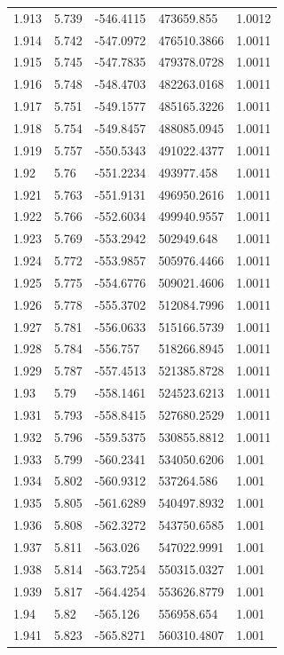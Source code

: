 \begin{tabular}{lllll}
1.913 & 5.739 & -546.4115 & 473659.855 & 1.0012 \\
1.914 & 5.742 & -547.0972 & 476510.3866 & 1.0011 \\
1.915 & 5.745 & -547.7835 & 479378.0728 & 1.0011 \\
1.916 & 5.748 & -548.4703 & 482263.0168 & 1.0011 \\
1.917 & 5.751 & -549.1577 & 485165.3226 & 1.0011 \\
1.918 & 5.754 & -549.8457 & 488085.0945 & 1.0011 \\
1.919 & 5.757 & -550.5343 & 491022.4377 & 1.0011 \\
1.92 & 5.76 & -551.2234 & 493977.458 & 1.0011 \\
1.921 & 5.763 & -551.9131 & 496950.2616 & 1.0011 \\
1.922 & 5.766 & -552.6034 & 499940.9557 & 1.0011 \\
1.923 & 5.769 & -553.2942 & 502949.648 & 1.0011 \\
1.924 & 5.772 & -553.9857 & 505976.4466 & 1.0011 \\
1.925 & 5.775 & -554.6776 & 509021.4606 & 1.0011 \\
1.926 & 5.778 & -555.3702 & 512084.7996 & 1.0011 \\
1.927 & 5.781 & -556.0633 & 515166.5739 & 1.0011 \\
1.928 & 5.784 & -556.757 & 518266.8945 & 1.0011 \\
1.929 & 5.787 & -557.4513 & 521385.8728 & 1.0011 \\
1.93 & 5.79 & -558.1461 & 524523.6213 & 1.0011 \\
1.931 & 5.793 & -558.8415 & 527680.2529 & 1.0011 \\
1.932 & 5.796 & -559.5375 & 530855.8812 & 1.0011 \\
1.933 & 5.799 & -560.2341 & 534050.6206 & 1.001 \\
1.934 & 5.802 & -560.9312 & 537264.586 & 1.001 \\
1.935 & 5.805 & -561.6289 & 540497.8932 & 1.001 \\
1.936 & 5.808 & -562.3272 & 543750.6585 & 1.001 \\
1.937 & 5.811 & -563.026 & 547022.9991 & 1.001 \\
1.938 & 5.814 & -563.7254 & 550315.0327 & 1.001 \\
1.939 & 5.817 & -564.4254 & 553626.8779 & 1.001 \\
1.94 & 5.82 & -565.126 & 556958.654 & 1.001 \\
1.941 & 5.823 & -565.8271 & 560310.4807 & 1.001 \\

\end{tabular}
